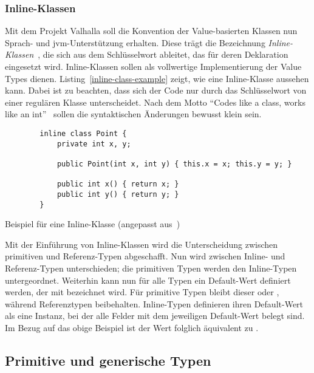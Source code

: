 \subsubsection{Inline-Klassen}

Mit dem Projekt Valhalla soll die Konvention der Value-basierten Klassen nun Sprach- und \ac{jvm}-Unterstützung erhalten.
Diese trägt die Bezeichnung \emph{Inline-Klassen}~\cite{object-model}, die sich aus dem Schlüsselwort  ableitet, das für deren Deklaration eingesetzt wird.
Inline-Klassen sollen als vollwertige Implementierung der Value Types dienen.
Listing~\ref{inline-class-example} zeigt, wie eine Inline-Klasse aussehen kann.
Dabei ist zu beachten, dass sich der Code nur durch das Schlüsselwort  von einer regulären Klasse unterscheidet.
Nach dem Motto ``Codes like a class, works like an int''~\cite{object-model} sollen die syntaktischen Änderungen bewusst klein sein.

\begin{listing}
    \begin{verbatim}
        inline class Point {
            private int x, y;

            public Point(int x, int y) { this.x = x; this.y = y; }

            public int x() { return x; }
            public int y() { return y; }
        }
    \end{verbatim}
    \vspace{-3ex}
    \caption{Beispiel für eine Inline-Klasse (angepasst aus~\cite{object-model})}
    \label{inline-class-example}
\end{listing}

Mit der Einführung von Inline-Klassen wird die Unterscheidung zwischen primitiven und Referenz-Typen abgeschafft.
Nun wird zwischen Inline- und Referenz-Typen unterschieden;
die primitiven Typen werden den Inline-Typen untergeordnet.
Weiterhin kann nun für alle Typen ein Default-Wert definiert werden, der mit  bezeichnet wird.
Für primitive Typen bleibt dieser  oder , während Referenztypen  beibehalten.
Inline-Typen definieren ihren Default-Wert als eine Instanz, bei der alle Felder mit dem jeweiligen Default-Wert belegt sind.
Im Bezug auf das obige Beispiel ist der Wert  folglich äquivalent zu .

\subsection{Primitive und generische Typen}\label{subsec:primitive-generics}

